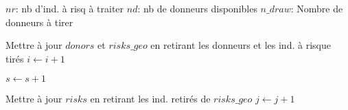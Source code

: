 \documentclass[10pt]{article}
\begin{document}
\begin{algorithm}
{{{$nr$: nb d'ind. à risq à traiter\;
$nd$: nb de donneurs disponibles\;
$n\_draw$: Nombre de donneurs à tirer\;


Mettre à jour $donors$ et $risks\_geo$ en retirant les donneurs et les ind. à risque tirés\;
$i \gets i + 1$\;

}

$s \gets s + 1$\;   

}

Mettre à jour $risks$ en retirant les ind. retirés de $risks\_geo$\;
$j \gets j + 1$\;


}



\end{algorithm}




\end{document}
